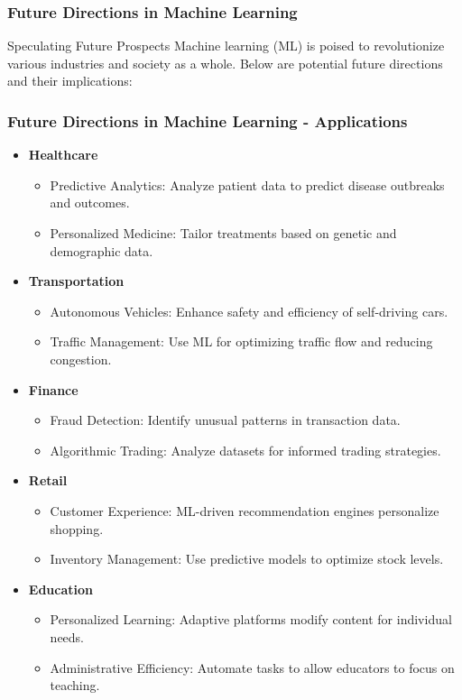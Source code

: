 \documentclass[aspectratio=169]{beamer}
\begin{document}
\begin{frame}[fragile]
    \frametitle{Future Directions in Machine Learning}
    \begin{block}{Speculating Future Prospects}
        Machine learning (ML) is poised to revolutionize various industries and society as a whole. Below are potential future directions and their implications:
    \end{block}
\end{frame}

\begin{frame}[fragile]
    \frametitle{Future Directions in Machine Learning - Applications}
    \begin{itemize}
        \item \textbf{Healthcare}
            \begin{itemize}
                \item Predictive Analytics: Analyze patient data to predict disease outbreaks and outcomes.
                \item Personalized Medicine: Tailor treatments based on genetic and demographic data.
            \end{itemize}
        \item \textbf{Transportation}
            \begin{itemize}
                \item Autonomous Vehicles: Enhance safety and efficiency of self-driving cars.
                \item Traffic Management: Use ML for optimizing traffic flow and reducing congestion.   
            \end{itemize}
        \item \textbf{Finance}
            \begin{itemize}
                \item Fraud Detection: Identify unusual patterns in transaction data.
                \item Algorithmic Trading: Analyze datasets for informed trading strategies.
            \end{itemize}
        \item \textbf{Retail}
            \begin{itemize}
                \item Customer Experience: ML-driven recommendation engines personalize shopping.
                \item Inventory Management: Use predictive models to optimize stock levels.
            \end{itemize}
        \item \textbf{Education}
            \begin{itemize}
                \item Personalized Learning: Adaptive platforms modify content for individual needs.
                \item Administrative Efficiency: Automate tasks to allow educators to focus on teaching.
            \end{itemize}
    \end{itemize}
\end{frame}
\end{document}
